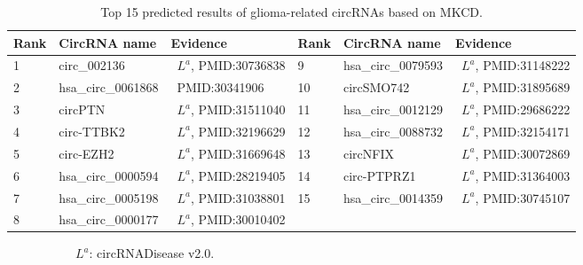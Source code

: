 \documentclass[journal,twoside,web]{ieeecolor}
\begin{document}
\begin{table}[!t]
	\centering
	\renewcommand{\arraystretch}{1.2}
	\begin{threeparttable}[b]
        \caption{Top 15 predicted results of glioma-related circRNAs based on MKCD.}	\label{tab:tab3}
        \label{tab:03}
		\begin{tabular}{p{1cm}<{\centering}  p{2.2cm}<{\centering} p{3.5cm}<{\centering} | p{1cm}<{\centering} p{2.2cm}<{\centering} p{3.5cm}<{\centering}}
            \hline
            Rank & CircRNA name & Evidence & Rank &	CircRNA name & Evidence \\
            \hline
            1 & circ\_002136 & \ $L^a$, PMID:30736838 & 9 & hsa\_circ\_0079593 & \ $L^a$, PMID:31148222 \\
            2 & hsa\_circ\_0061868 & \ PMID:30341906 & 10 & circSMO742 & \ $L^a$, PMID:31895689 \\
            3 & circPTN & \ $L^a$, PMID:31511040 & 11 & hsa\_circ\_0012129 & \ $L^a$, PMID:29686222 \\
            4 & circ-TTBK2 & \ $L^a$, PMID:32196629 & 12 & hsa\_circ\_0088732 & \ $L^a$, PMID:32154171 \\
            5 & circ-EZH2 & \ $L^a$, PMID:31669648 & 13 & circNFIX & \ $L^a$, PMID:30072869 \\
            6 & hsa\_circ\_0000594 & \ $L^a$, PMID:28219405 & 14 & circ-PTPRZ1 & \ $L^a$, PMID:31364003 \\
            7 & hsa\_circ\_0005198 & \ $L^a$, PMID:31038801 & 15 & hsa\_circ\_0014359 & \ $L^a$, PMID:30745107 \\
            8 & hsa\_circ\_0000177 & \ $L^a$, PMID:30010402 & & & \\
             \hline
		\end{tabular}
	\end{threeparttable}
    \begin{flushleft}
        \ \ \ \ \ \ \ \ \ \ \ $L^a$: circRNADisease v2.0.
    \end{flushleft}
    \vspace{-0.4cm}
\end{table}
\end{document}
